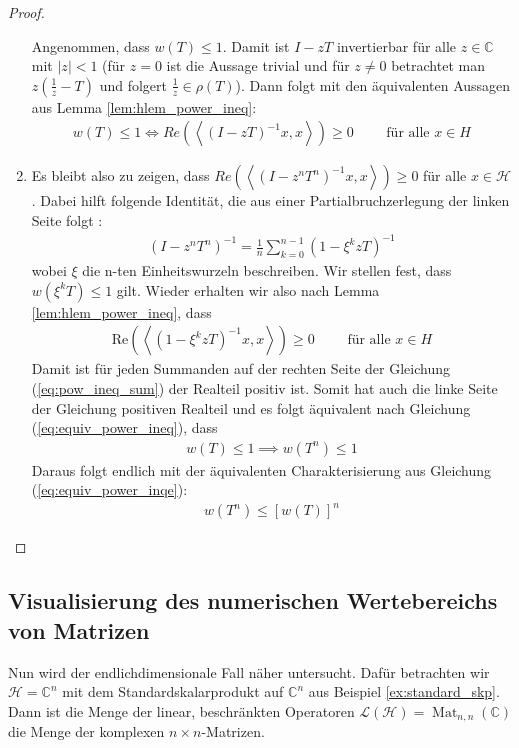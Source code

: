 \begin{proof}
\begin{enumerate}[label=\protect\circled{\arabic{*}}]
		Angenommen, dass $w(T) \le 1$. Damit ist $I-zT$ invertierbar für alle $z \in \mathbb{C}$ mit $|z| < 1$ (für $z=0$ ist die Aussage trivial und für $z\neq0$ betrachtet man $z (\frac{1}{z} - T)$ und folgert $\frac{1}{z} \in \rho(T)$). Dann folgt mit den äquivalenten Aussagen aus Lemma \ref{lem:hlem_power_ineq}:
		\begin{align} \label{eq:equiv_power_ineq}
			w(T) \le 1 \iff Re( \left< (I - zT)^{-1}x,x \right> ) \ge 0 \qquad \text{ für alle } x \in H 
		\end{align}
		\item Es bleibt also zu zeigen, dass $Re( \left< (I - z^nT^n)^{-1}x,x \right> ) \ge 0$ für alle $x\in \mathcal{H}$. Dabei hilft folgende Identität, die aus einer Partialbruchzerlegung der linken Seite folgt \parencite*[vgl.][S. 321]{halmos2012hilbert}:
		\begin{align} \label{eq:pow_ineq_sum}
			(I - z^nT^n)^{-1} = \frac{1}{n} \sum_{k=0}^{n-1} (1-\xi^k zT)^{-1}
		\end{align}
		wobei $\xi$ die n-ten Einheitswurzeln beschreiben. Wir stellen fest, dass $w(\xi^k T) \le 1$ gilt. Wieder erhalten wir also nach Lemma \ref{lem:hlem_power_ineq}, dass
		\begin{align}
			\mathrm{Re}(\left< (1-\xi^k zT)^{-1}x,x \right>) \ge 0 \qquad \text{ für alle } x \in H 
		\end{align}
		 Damit ist für jeden Summanden auf der rechten Seite der Gleichung (\ref{eq:pow_ineq_sum}) der Realteil positiv ist. Somit hat auch die linke Seite der Gleichung positiven Realteil und es folgt äquivalent nach Gleichung (\ref{eq:equiv_power_ineq}), dass
		\begin{align*}
			w(T) \le 1 \implies w(T^n) \le 1
		\end{align*}
		Daraus folgt endlich mit der äquivalenten Charakterisierung aus Gleichung (\ref{eq:equiv_power_inqe}):
		\begin{align*}
			w(T^n) \le [w(T)]^n
		\end{align*}
	\end{enumerate}
\end{proof}


\subsection{Visualisierung des numerischen Wertebereichs von Matrizen}
Nun wird der endlichdimensionale Fall näher untersucht. \phantom{.} Dafür betrachten wir \mbox{$\mathcal{H}=\mathbb{C}^n$} mit dem Standardskalarprodukt auf $\mathbb{C}^n$ aus Beispiel \ref{ex:standard_skp}. Dann ist die Menge der linear, beschränkten Operatoren $\mathcal{L}(\mathcal{H}) = \operatorname{Mat}_{n,n}(\mathbb{C})$ die Menge der komplexen $n \times n$-Matrizen. 

